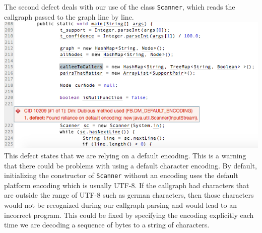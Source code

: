 \documentclass{article}
\begin{document}
The second defect deals with our use of the class \verb|Scanner|, which reads the callgraph passed to the graph line by line. \\
\includegraphics[scale=0.5]{ss/bug_dubious_method.png} \\
This defect states that we are relying on a default encoding. This is a warning that there could be problems with using a default character encoding. By default, initializing the constructor of \verb|Scanner| without an encoding uses the default platform encoding which is usually UTF-8. If the callgraph had characters that are outside the range of UTF-8 such as german characters, then those characters would not be recognized during our callgraph parsing and would lead to an incorrect program. This could be fixed by specifying the encoding explicitly each time we are decoding a sequence of bytes to a string of characters.
\end{document}
